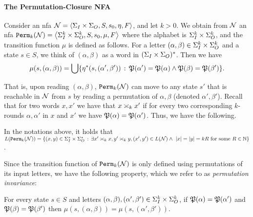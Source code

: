 \paragraph{The Permutation-Closure \bf NFA}
Consider an \gls{nfa} $\cN=\tup{\sI\times\sO,S,s_0,\eta,F}$, and let $k>0$. 
We obtain from $\cN$ an \gls{nfa} $\perm_k(\cN)=\tup{\sI^k \times \sO^k,S, s_0, \mu, F}$
where the alphabet is $\sI^k\times \sO^k$, and the transition function $\mu$ is defined as follows. For a letter $(\alpha,\beta)\in \sI^k \times \sO^k$ and a state $s\in S$, we think of $(\alpha,\beta)$ as a word in $(\sI\times \sO)^*$. Then we have
\begin{equation}
\label{test}
    \mu(s,(\alpha,\beta))=\bigcup\{\eta^*(s,(\alpha',\beta')) \ST \fP(\alpha')=\fP(\alpha) \wedge \fP(\beta)=\fP(\beta')\}.
\end{equation}

That is, upon reading $(\alpha,\beta)$, $\perm_k(\cN)$ can move to any state $s'$ that is reachable in $\cN$ from $s$
by reading a permutation of $\alpha,\beta$ (denoted $\alpha',\beta'$).
Recall that for two words $x,x'$ we have that $x\req[k]x'$ if for every two corresponding $k$-rounds $\alpha,\alpha'$ in $x$ and $x'$ we have $\fP(\alpha)=\fP(\alpha')$. 
Thus, we have the following.
\begin{observation}
	\label{obs:perm_closure_language}
	In the notations above, it holds that $L(\perm_k(\cN))=\{(x,y)\in \sI^*\times \sO^* \ST \exists x'\req[k] x, y'\req[k] y, (x',y')\in L(\cN) \wedge\ |x|=|y|=kR \text{ for some }R\in \bbN\}$.
	\end{observation}
Since the transition function of $\perm_k(\cN)$ is only defined using permutations of its input letters, we have the following property, which we refer to as \emph{permutation invariance}:
\begin{observation}
	\label{obs:perm_invariance}
	For every state $s\in S$ and letters $(\alpha,\beta), (\alpha',\beta')\in \sI^k \times \sO^k$, if $\fP(\alpha)=\fP(\alpha')$ and $\fP(\beta)=\fP(\beta')$ then $\mu(s,(\alpha,\beta))=\mu(s,(\alpha',\beta'))$.
\end{observation}

